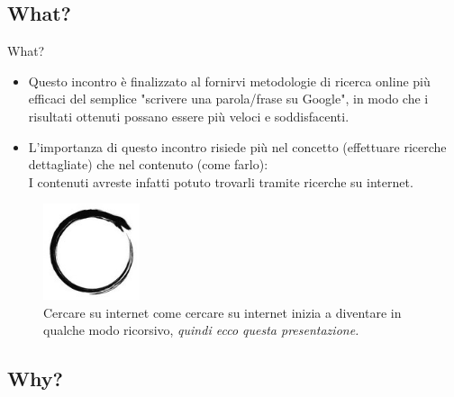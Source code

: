 \documentclass{beamer}
\begin{document}
\subsection{What?}
\begin{frame}{What?}
\footnotesize
\begin{itemize}
\item Questo incontro è finalizzato al fornirvi metodologie di ricerca online più efficaci del semplice "scrivere una parola/frase su Google", in modo che i risultati ottenuti possano essere più veloci e soddisfacenti.\\ 
\item L'importanza di questo incontro risiede più nel concetto (effettuare ricerche dettagliate) che nel contenuto (come farlo): \\
I contenuti avreste infatti potuto trovarli tramite ricerche su internet.
\end{itemize}
\begin{figure}[h!]
\begin{center}
\includegraphics[width=80pt]{immagini/uroboros.jpg}
\begin{center}\caption {Cercare su internet come cercare su internet inizia a diventare in qualche modo ricorsivo, \textit{quindi ecco questa presentazione.}}\end{center}
\end{center}
\end{figure}
\end{frame}

\subsection{Why?}
\end{document}
